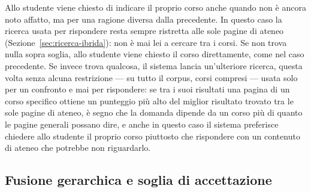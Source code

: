 Allo studente viene chiesto di indicare il proprio corso anche quando non è ancora noto affatto, ma per una ragione
diversa dalla precedente. In questo caso la ricerca usata per rispondere resta sempre ristretta alle sole pagine di
ateneo (Sezione~\ref{sec:ricerca-ibrida}): non è mai lei a cercare tra i corsi. Se non trova nulla sopra soglia,
allo studente viene chiesto il corso direttamente, come nel caso precedente. Se invece trova qualcosa, il sistema
lancia un'ulteriore ricerca, questa volta senza alcuna restrizione --- su tutto il corpus, corsi compresi --- usata
solo per un confronto e mai per rispondere: se tra i suoi risultati una pagina di un corso specifico ottiene un
punteggio più alto del miglior risultato trovato tra le sole pagine di ateneo, è segno che la domanda dipende da un
corso più di quanto le pagine generali possano dire, e anche in questo caso il sistema preferisce chiedere allo
studente il proprio corso piuttosto che rispondere con un contenuto di ateneo che potrebbe non riguardarlo.

\subsection{Fusione gerarchica e soglia di accettazione}

